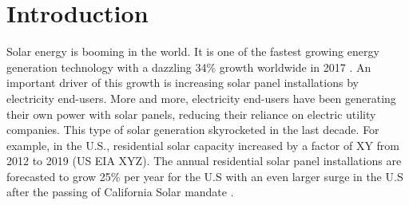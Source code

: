 \documentclass[msom,blindrev]{informs3}
\begin{document}
%


\section{Introduction}

Solar energy is booming in the world. It is one of the fastest growing energy generation technology with a dazzling 34\% growth worldwide in 2017 \citep{iea2018snapshot}. An important driver of this growth is increasing solar panel installations by electricity end-users. More and more, electricity end-users have been generating their own power with solar panels, reducing their reliance on electric utility companies. This type of solar generation skyrocketed in the last decade. For example, in the U.S., residential solar capacity increased by a factor of XY from 2012 to 2019 (US EIA XYZ). The annual residential solar panel installations are forecasted to grow 25\% per year for the U.S \citep{weaver_2019,seia} with an even larger surge in the U.S after the passing of California Solar mandate \citep{gtmsolar2018}.
\end{document}
